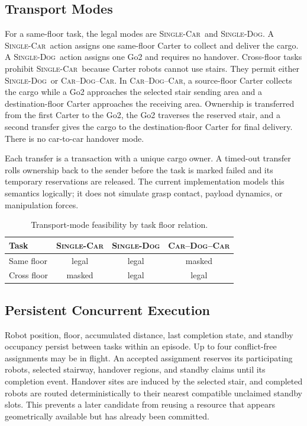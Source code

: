 \documentclass[journal]{IEEEtran}
\DeclareRobustCommand{\modecar}{\mbox{\textsc{Single-Car}}\xspace}
\DeclareRobustCommand{\modedog}{\mbox{\textsc{Single-Dog}}\xspace}
\DeclareRobustCommand{\modechain}{\mbox{\textsc{Car--Dog--Car}}\xspace}
\begin{document}
\subsection{Transport Modes}

For a same-floor task, the legal modes are \modecar{}~and \modedog. A \modecar{}~action assigns one same-floor Carter to collect and deliver the cargo. A \modedog{}~action assigns one Go2 and requires no handover. Cross-floor tasks prohibit \modecar{}~because Carter robots cannot use stairs. They permit either \modedog{}~or \modechain. In \modechain, a source-floor Carter collects the cargo while a Go2 approaches the selected stair sending area and a destination-floor Carter approaches the receiving area. Ownership is transferred from the first Carter to the Go2, the Go2 traverses the reserved stair, and a second transfer gives the cargo to the destination-floor Carter for final delivery. There is no car-to-car handover mode.

Each transfer is a transaction with a unique cargo owner. A timed-out transfer rolls ownership back to the sender before the task is marked failed and its temporary reservations are released. The current implementation models this semantics logically; it does not simulate grasp contact, payload dynamics, or manipulation forces.

\begin{table}[t]
\centering
\caption{Transport-mode feasibility by task floor relation.}
\label{tab:mode_feasibility}
\begin{tabular}{lccc}
\toprule
Task & \modecar & \modedog & \modechain \\
\midrule
Same floor  & legal & legal & masked \\
Cross floor & masked & legal & legal \\
\bottomrule
\end{tabular}
\end{table}

\subsection{Persistent Concurrent Execution}

Robot position, floor, accumulated distance, last completion state, and standby occupancy persist between tasks within an episode. Up to four conflict-free assignments may be in flight. An accepted assignment reserves its participating robots, selected stairway, handover regions, and standby claims until its completion event. Handover sites are induced by the selected stair, and completed robots are routed deterministically to their nearest compatible unclaimed standby slots. This prevents a later candidate from reusing a resource that appears geometrically available but has already been committed.
\end{document}
